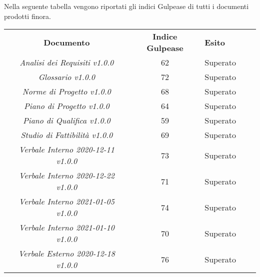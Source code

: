 Nella seguente tabella vengono riportati gli indici Gulpease\glo{} di tutti
i documenti prodotti finora.
\begin{table}[H]
    \caption{Tabella dell'indice di Gulpease}
\renewcommand{\arraystretch}{1.5}
\begin{longtable}{ c c  C{4cm}  c  c }
    \rowcolor{\primaryColor}
    \textcolor{\secondaryColor}{
    \centering\textbf{Documento}}     & \textcolor{\secondaryColor}{\centering\textbf{Indice Gulpease}}    & \textcolor{\secondaryColor}
    {\centering\textbf{Esito}} \\
    \textit{Analisi dei Requisiti v1.0.0}           & 62                                    & Superato{} \\
    \textit{Glossario v1.0.0}                       & 72                                    & Superato{} \\
    \textit{Norme di Progetto v1.0.0}               & 68                                   & Superato{} \\
    \textit{Piano di Progetto v1.0.0}                & 64                                    & Superato{} \\
    \textit{Piano di Qualifica v1.0.0}                & 59                                    & Superato{} \\
    \textit{Studio di Fattibilità v1.0.0}               & 69                                    & Superato{} \\
    \textit{Verbale Interno 2020-12-11 v1.0.0}          & 73                                    & Superato{} \\
    \textit{Verbale Interno 2020-12-22 v1.0.0}          & 71                                    & Superato{} \\
    \textit{Verbale Interno 2021-01-05 v1.0.0}          & 74                                    & Superato{} \\
    \textit{Verbale Interno 2021-01-10 v1.0.0}          & 70                                    & Superato{} \\
    \textit{Verbale Esterno 2020-12-18 v1.0.0}          & 76                                    & Superato{} \\
\end{longtable}
\end{table}



